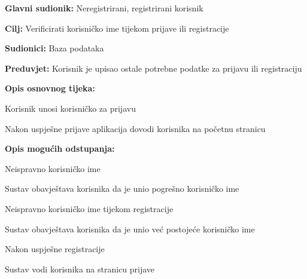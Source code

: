 				\noindent {}
					\begin{packed_item}
	
						\item \textbf{Glavni sudionik: }Neregistrirani, registrirani korisnik
						\item  \textbf{Cilj:} Verificirati korisničko ime tijekom prijave ili registracije
						\item  \textbf{Sudionici:} Baza podataka
						\item  \textbf{Preduvjet:} Korisnik je upisao ostale potrebne podatke za prijavu ili registraciju
						\item  \textbf{Opis osnovnog tijeka:}
						
						\item[] \begin{packed_enum}
	
							\item Korisnik unosi korisničko za prijavu
							\item Nakon uspješne prijave aplikacija dovodi korisnika na početnu stranicu
							
						\end{packed_enum}
						
						\item  \textbf{Opis mogućih odstupanja:}
						
						\item[] \begin{packed_item}
	
							\item[1.a] Neispravno korisničko ime	
								\begin{packed_item}
									\item Sustav obavještava korisnika da je unio pogrešno korisničko ime
								\end{packed_item}
								
							\item[1.b] Neispravno korisničko ime tijekom registracije
								\begin{packed_item}
									\item Sustav obavještava korisnika da je unio već postojeće korisničko ime
								\end{packed_item}
								
							\item[2.a] Nakon uspješne registracije
								\begin{packed_item}
									\item Sustav vodi korisnika na stranicu prijave
								\end{packed_item}
							
						\end{packed_item}				
					\end{packed_item}
					
